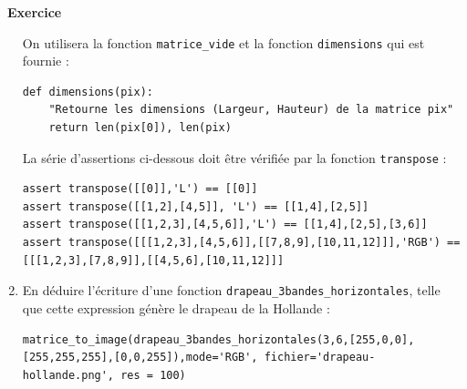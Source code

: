 \documentclass[a4paper, french, 12pt]{article}
\newcounter{exo}
\newenvironment{exercice}[1]
{\par \medskip   \addtocounter{exo}{1} \noindent  
\begin{bclogo}[arrondi =0.1,   noborder = true, logo=\bccrayon, marge=4]{~\textbf{Exercice} \textbf{\theexo} {\itshape #1} }  \par}
{
\end{bclogo}
 \par \bigskip }
\newcounter{def}
\begin{document}
\begin{exercice}{}
\begin{enumerate}
On utilisera la fonction \texttt{matrice\_vide} et la fonction \texttt{dimensions} qui est fournie :

\begin{lstlisting}[style=rond]
def dimensions(pix):
    "Retourne les dimensions (Largeur, Hauteur) de la matrice pix"
    return len(pix[0]), len(pix) 
\end{lstlisting}

La série d'assertions ci-dessous doit être vérifiée par la fonction \texttt{transpose} :

\begin{lstlisting}[style=compil]
assert transpose([[0]],'L') == [[0]]
assert transpose([[1,2],[4,5]], 'L') == [[1,4],[2,5]]
assert transpose([[1,2,3],[4,5,6]],'L') == [[1,4],[2,5],[3,6]]
assert transpose([[[1,2,3],[4,5,6]],[[7,8,9],[10,11,12]]],'RGB') == [[[1,2,3],[7,8,9]],[[4,5,6],[10,11,12]]]
\end{lstlisting}
 
   \item En déduire l'écriture d'une fonction \texttt{drapeau\_3bandes\_horizontales}, telle que cette expression génère le drapeau de la Hollande :
   
\begin{lstlisting}[style=compil]
matrice_to_image(drapeau_3bandes_horizontales(3,6,[255,0,0], [255,255,255],[0,0,255]),mode='RGB', fichier='drapeau-hollande.png', res = 100)
\end{lstlisting}

\end{enumerate}
\end{exercice}


\vspace*{-20pt}
\end{document}
